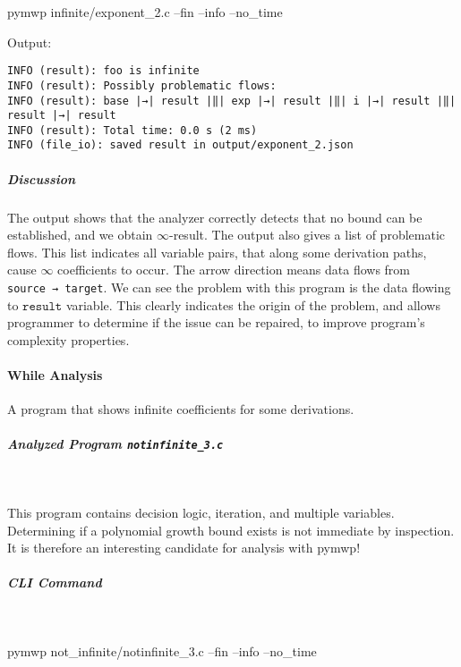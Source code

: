 \begin{console}[label={lst:ex2-run-cmd}]
pymwp infinite/exponent_2.c --fin --info --no_time
\end{console}

Output:

\begin{lstlisting}[escapeinside=||,label={lst:ex2-output}]
INFO (result): foo is infinite
INFO (result): Possibly problematic flows:
INFO (result): base |→| result |‖| exp |→| result |‖| i |→| result |‖| result |→| result
INFO (result): Total time: 0.0 s (2 ms)
INFO (file_io): saved result in output/exponent_2.json
\end{lstlisting}

\subparagraph*{Discussion}
The output shows that the analyzer correctly detects that no bound can
be established, and we obtain \(\infty\)-result.
The output also gives a list of problematic flows.
This list indicates all variable pairs, that along some derivation paths, cause \(\infty\) coefficients to occur.
The arrow direction means data flows from \texttt{source\ →\ target}.
We can see the problem with this program is the data flowing to \(\texttt{result}\) variable.
This clearly indicates the origin of the problem, and allows programmer to determine if the issue can be
repaired, to improve program's complexity properties.
\pagebreak

\paragraph{While Analysis}\label{while-analysis}
A program that shows infinite coefficients for some derivations.

\subparagraph*{Analyzed Program \texttt{notinfinite\_3.c}}\mbox{}\\
\begin{minipage}{\textwidth}

\end{minipage}
This program contains decision logic, iteration, and multiple variables.
Determining if a polynomial growth bound exists is not immediate by inspection.
It is therefore an interesting candidate for analysis with pymwp!

\subparagraph*{CLI Command}\label{cli-command}\mbox{}\\
\begin{console}[label={lst:ex3-run-cmd}]
pymwp not_infinite/notinfinite_3.c --fin --info --no_time
\end{console}

